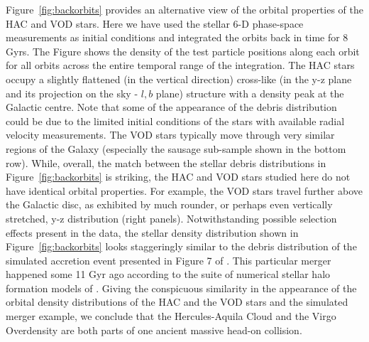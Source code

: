 \documentclass[fleqn,usenatbib]{mnras}
\begin{document}
Figure~\ref{fig:backorbits} provides an alternative view of the
orbital properties of the HAC and VOD stars. Here we have used the
stellar 6-D phase-space measurements as initial conditions and
integrated the orbits back in time for 8 Gyrs. The Figure shows the
density of the test particle positions along each orbit for all orbits
across the entire temporal range of the integration. The HAC stars
occupy a slightly flattened (in the vertical direction) cross-like (in
the y-z plane and its projection on the sky - $l,b$ plane) structure
with a density peak at the Galactic centre. Note that some of the
appearance of the debris distribution could be due to the limited
initial conditions of the stars with available radial velocity
measurements. The VOD stars typically move through very similar
regions of the Galaxy (especially the sausage sub-sample shown in the
bottom row). While, overall, the match between the stellar debris
distributions in Figure~\ref{fig:backorbits} is striking, the HAC and
VOD stars studied here do not have identical orbital properties. For
example, the VOD stars travel further above the Galactic disc, as
exhibited by much rounder, or perhaps even vertically stretched, y-z
distribution (right panels).
%
Notwithstanding possible selection effects present in the data, the
stellar density distribution shown in Figure~\ref{fig:backorbits}
looks staggeringly similar to the debris distribution of the simulated
accretion event presented in Figure 7 of \citet{Simion2018}. This
particular merger happened some 11 Gyr ago according to the suite of
numerical stellar halo formation models of \citet{Bu05}. Giving the
conspicuous similarity in the appearance of the orbital density
distributions of the HAC and the VOD stars and the simulated merger
example, we conclude that the Hercules-Aquila Cloud and the Virgo
Overdensity are both parts of one ancient massive head-on collision.
%
%
\end{document}
